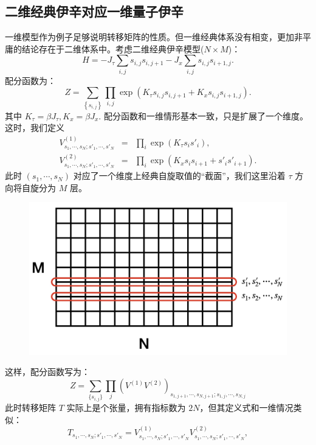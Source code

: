 \documentclass[UTF8]{ctexart}
\begin{document}
\subsection*{二维经典伊辛对应一维量子伊辛}
\noindent
一维模型作为例子足够说明转移矩阵的性质。但一维经典体系没有相变，更加非平庸的结论存在于二维体系中。考虑二维经典伊辛模型($N\times M$)：
\begin{equation}
	H=-J_{\tau}\sum_{i,j}s_{i,j}s_{i,j+1}-J_{x}\sum_{i,j}s_{i,j}s_{i+1,j}.
\end{equation}
配分函数为：
\begin{equation}
	Z=\sum_{\left\{ s_{i,j}\right\} }\prod_{i,j} \exp\left(K_{\tau}s_{i,j}s_{i,j+1} + K_{x}s_{i,j}s_{i+1,j}\right).
\end{equation}
其中 $K_\tau = \beta J_\tau, K_x = \beta J_x$. 配分函数和一维情形基本一致，只是扩展了一个维度。这时，我们定义
\begin{eqnarray}
	V^{(1)}_{s_1,\cdots,s_N;s'_1,\cdots,s'_N} 
	&=& \prod_{i}\exp(K_{\tau}s_{i}s'_{i}), \\
	V^{(2)}_{s_1,\cdots,s_N;s'_1,\cdots,s'_N}
	&=&  \prod_i \exp\left(K_{x} s_i s_{i+1}+s'_is'_{i+1}\right).
\end{eqnarray}
此时 $(s_1,\cdots,s_N)$ 对应了一个维度上经典自旋取值的“截面”，我们这里沿着 $\tau$ 方向将自旋分为 $M$ 层。
\begin{figure}[H]
\begin{centering}
\includegraphics[width=0.6\linewidth]{include/T-tensor}
\par\end{centering}
\end{figure}
\noindent 
这样，配分函数写为：
\begin{equation}
	Z = \sum_{\{s_{i,j}\}}\prod_{j} \left(V^{(1)} V^{(2)}\right)_{s_{1,j+1},\cdots,s_{N,j+1};s_{1,j},\cdots,s_{N,j}}
\end{equation} 
此时转移矩阵 $T$ 实际上是个张量，拥有指标数为 $2N$，但其定义式和一维情况类似：
\begin{equation}
	T_{s_1,\cdots,s_N;s'_1,\cdots,s'_N} = 
	V^{(1)}_{s_1,\cdots,s_N;s'_1,\cdots,s'_N}
	V^{(2)}_{s_1,\cdots,s_N;s'_1,\cdots,s'_N},
\end{equation}
\end{document}

